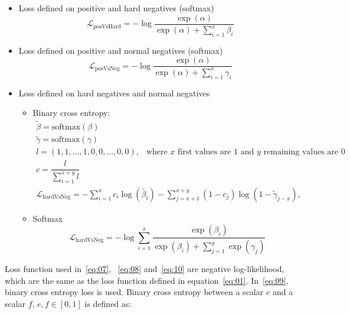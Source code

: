 \documentclass[12pt, sort&compress]{report}
\begin{document}
\begin{itemize}
	\item Loss defined on positive and hard negatives (softmax)
	\begin{equation}
		\label{eq:07}
		\mathcal{L}_{\text{posVsHard}} = -\log\dfrac{\exp\left(\alpha\right)}{\exp\left(\alpha\right) + \sum\limits_{i=1}^x\beta_i}
	\end{equation}
	\item Loss defined on positive and normal negatives (softmax)
	\begin{equation}
		\label{eq:08}
		\mathcal{L}_{\text{posVsNeg}} = -\log\dfrac{\exp\left(\alpha\right)}{\exp\left(\alpha\right) + \sum\limits_{i=1}^x\gamma_i}
	\end{equation}
	\item Loss defined on hard negatives and normal negatives
	\begin{itemize}
		\item Binary cross entropy:
		\begin{equation}
			\label{eq:09}
			\begin{array}{l}
				\tilde{\beta} = \text{softmax}(\beta) \\
				\tilde{\gamma} = \text{softmax}(\gamma) \\ 
				l = (1, 1, ..., 1, 0, 0, ... ,0, 0),\:\: \text{ where } x \text{ first values are 1 and } y \text{ remaining values are 0 } \\
				c = \dfrac{l}{\sum\limits_{i=1}^{x + y} l} \\
				\mathcal{L}_{\text{hardVsNeg}} = -\sum\limits_{i=1}^x c_i\log\left(\tilde{\beta_i}\right) - \sum\limits_{j=x+1}^{x+y}(1 - c_j)\log(1-\tilde{\gamma}_{j-x}),
			\end{array}
		\end{equation}
		\item Softmax
		\begin{equation}
			\label{eq:10}
			\mathcal{L}_{\text{hardVsNeg}} = -\log\sum\limits_{i=1}^x\dfrac{\exp\left(\beta_i\right)}{\exp\left(\beta_i\right) + \sum\limits_{j=1}^y\exp\left(\gamma_j\right)}
		\end{equation}
	\end{itemize}
\end{itemize}
\par Loss function used in~\eqref{eq:07}, ~\eqref{eq:08} and~\eqref{eq:10} are negative log-likelihood, which are the same as the loss function defined in equation~\eqref{eq:01}. In~\eqref{eq:09}, binary cross entropy loss is used. Binary cross entropy between a scalar $e$ and a scalar $f$, $e, f \in [0, 1]$ is defined as:
\end{document}
